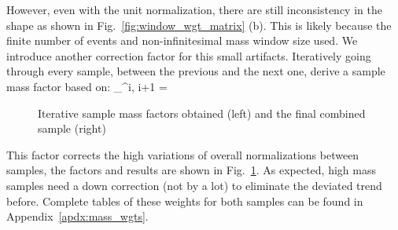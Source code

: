 However, even with the unit normalization, there are still inconsistency in the shape as shown
in Fig.~\ref{fig:window_wgt_matrix} (b). This is likely because the finite number of events
and non-infinitesimal mass window size used. We introduce another correction factor for
this small artifacts. Iteratively going through every sample, between the previous and the
next one, derive a sample mass factor based on:
\be
{}_^{i, i+1} = 
\ee

\begin{figure}[htb]
    \begin{center}
    \end{center}
    \caption{Iterative sample mass factors obtained (left) and the final combined sample (right)}
    \label{fig:LHE_rewgt}
\end{figure}

This factor corrects the high variations of overall normalizations between samples, the factors and results
are shown in Fig.~\ref{fig:LHE_rewgt}. As expected, high mass samples need a down correction (not by a lot)
to eliminate the deviated trend before. Complete tables of these weights for both samples can be found
in Appendix~\ref{apdx:mass_wgts}.

